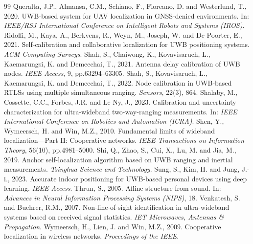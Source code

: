 \documentclass[11pt,a4paper]{article}
\begin{document}
\begin{thebibliography}{99}
 Queralta, J.P., Almansa, C.M., Schiano, F., Floreano, D. and Westerlund, T., 2020. UWB-based system for UAV localization in GNSS-denied environments. In: \emph{IEEE/RSJ International Conference on Intelligent Robots and Systems (IROS)}.
 Ridolfi, M., Kaya, A., Berkvens, R., Weyn, M., Joseph, W. and De Poorter, E., 2021. Self-calibration and collaborative localization for UWB positioning systems. \emph{ACM Computing Surveys}.
 Shah, S., Chaiwong, K., Kovavisaruch, L., Kaemarungsi, K. and Demeechai, T., 2021. Antenna delay calibration of UWB nodes. \emph{IEEE Access}, 9, pp.63294--63305.
 Shah, S., Kovavisaruch, L., Kaemarungsi, K. and Demeechai, T., 2022. Node calibration in UWB-based RTLSs using multiple simultaneous ranging. \emph{Sensors}, 22(3), 864.
 Shalaby, M., Cossette, C.C., Forbes, J.R. and Le Ny, J., 2023. Calibration and uncertainty characterization for ultra-wideband two-way-ranging measurements. In: \emph{IEEE International Conference on Robotics and Automation (ICRA)}.
 Shen, Y., Wymeersch, H. and Win, M.Z., 2010. Fundamental limits of wideband localization---Part II: Cooperative networks. \emph{IEEE Transactions on Information Theory}, 56(10), pp.4981--5000.
 Shi, Q., Zhao, S., Cui, X., Lu, M. and Jia, M., 2019. Anchor self-localization algorithm based on UWB ranging and inertial measurements. \emph{Tsinghua Science and Technology}.
 Sung, S., Kim, H. and Jung, J.-i., 2023. Accurate indoor positioning for UWB-based personal devices using deep learning. \emph{IEEE Access}.
 Thrun, S., 2005. Affine structure from sound. In: \emph{Advances in Neural Information Processing Systems (NIPS)}, 18.
 Venkatesh, S. and Buehrer, R.M., 2007. Non-line-of-sight identification in ultra-wideband systems based on received signal statistics. \emph{IET Microwaves, Antennas \& Propagation}.
 Wymeersch, H., Lien, J. and Win, M.Z., 2009. Cooperative localization in wireless networks. \emph{Proceedings of the IEEE}.

\end{thebibliography}
\end{document}
